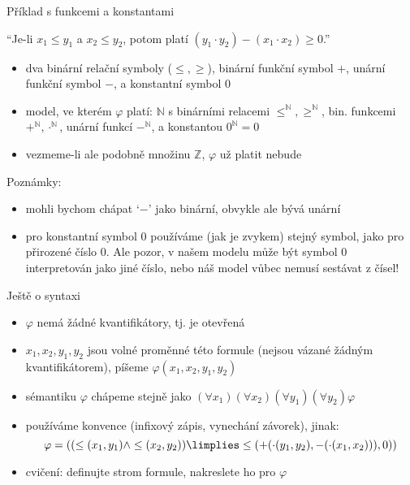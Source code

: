 \documentclass{beamer}
\begin{document}
\begin{frame}{Příklad s funkcemi a konstantami}

    ``Je-li $x_1\leq y_1$ a $x_2\leq y_2$, potom platí $(y_1 \cdot y_2)-(x_1\cdot x_2)\geq 0$.''\pause

    \pause

    \begin{itemize}
        \item dva binární relační symboly ($\leq,\geq$), binární funkční symbol $+$, unární funkční symbol $-$, a konstantní symbol $0$\pause
        \item \alert{model, ve kterém $\varphi$ platí:} $\mathbb N$ s binárními relacemi $\leq^\mathbb N,\geq^\mathbb N$, bin. funkcemi $+^\mathbb N,\cdot^\mathbb N$, unární funkcí $-^\mathbb N$, a konstantou $0^\mathbb N=0$ \pause
        \item vezmeme-li ale podobně množinu $\mathbb Z$, $\varphi$ už platit nebude\pause
    \end{itemize}
    Poznámky:\pause
    \begin{itemize}
        \item mohli bychom chápat `$-$' jako binární, obvykle ale bývá unární\pause
        \item pro \alert{konstantní symbol} $0$ používáme (jak je zvykem) stejný symbol, jako pro přirozené číslo 0. \pause Ale pozor, v našem modelu může být \alert{symbol} $0$ interpretován jako \alert{jiné číslo}, nebo náš model vůbec nemusí sestávat z čísel!
    \end{itemize}

\end{frame}


\begin{frame}{Ještě o syntaxi}

    \pause

    \begin{itemize}
        \item $\varphi$ nemá žádné kvantifikátory, tj. je \alert{otevřená}\pause
        \item $x_1,x_2,y_1,y_2$ jsou \alert{volné proměnné} této formule (nejsou \alert{vázané} žádným kvantifikátorem), píšeme $\varphi(x_1,x_2,y_1,y_2)$\pause
        \item sémantiku $\varphi$ chápeme stejně jako $(\forall x_1)(\forall x_2)(\forall y_1)(\forall y_2)\varphi$\pause
        \item používáme \alert{konvence} (infixový zápis, vynechání závorek), jinak:
        $$
        \varphi=((\leq (x_1,y_1) \land \leq(x_2,y_2))\limplies \leq(+(\cdot (y_1,y_2),-(\cdot(x_1,x_2))),0))
        $$\pause
        \item cvičení: definujte \alert{strom formule}, nakreslete ho pro $\varphi$
    \end{itemize}
   
\end{frame}
\end{document}

